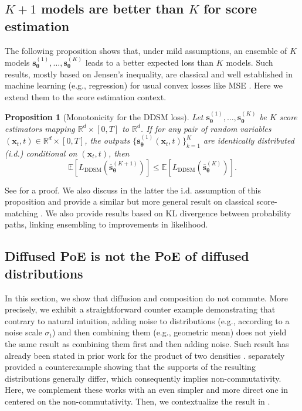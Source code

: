 \documentclass[10pt]{article} %
\newcommand{\DDSM}{\text{DDSM}}
\newtheorem{proposition}{Proposition}[section]
\def\rvx{{\mathbf{x}}}
\def\vtheta{{\bm{\theta}}}
\def\vs{{\bm{s}}}
\newcommand{\R}{\mathbb{R}}
\begin{document}
\subsection{$K+1$ models are better than $K$ for score estimation} \label{section: K models better for score}

The following proposition shows that, under mild assumptions, an ensemble of $K$ models $\vs_\vtheta^{(1)},\dots,\vs^{(K)}_\vtheta$ leads to a better expected loss than $K$ models. Such results, mostly based on Jensen's inequality, are classical and well established in machine learning (e.g., regression) for usual convex losses like MSE \citep{mcnees1992uses,breiman1996bagging,mattei2024ensemblesgettingbettertime}. Here we extend them to the score estimation context.

\begin{proposition}[Monotonicity for the DDSM loss]\label{proposition: ensemble monotonicity true score loss}
Let $\vs_\vtheta^{(1)}, \dots, \vs_\vtheta^{(K)}$ be $K$ score estimators mapping $\R^d \times [0,T]$ to $\R^d$. If for any pair of random variables $(\rvx_t, t) \in \R^d \times [0,T] $, the outputs $\{\vs^{(1)}_\vtheta(\rvx_t,t)\}_{k=1}^K $ are identically distributed (i.d.) conditional on $(\rvx_t,t)$, then
\begin{equation}
\mathbb{E}\left[ L_{\DDSM}(\overline{\vs}_\vtheta^{(K+1)}) \right] \leq \mathbb{E}\left[ L_{\DDSM}(\overline{\vs}_\vtheta^{(K)}) \right].
\end{equation}
\end{proposition}

See  for a proof. We also discuss in the latter the i.d. assumption of this proposition and provide a similar but more general result on classical score-matching \citep{hyvarinen2005estimation}. We also provide results based on KL divergence between probability paths, linking ensembling to improvements in likelihood.

\subsection{Diffused PoE is not the PoE of diffused distributions}\label{section: PoE pitfalls}

In this section, we show that diffusion and composition do not commute. More precisely, we exhibit a straightforward counter example demonstrating that contrary to natural intuition, adding noise to distributions (e.g., according to a noise scale $\sigma_t$) and then combining them (e.g., geometric mean) does not yield the same result as combining them first and then adding noise. Such result has already been stated in prior work for the product of two densities \citep{du2023reducereuserecyclecompositional}. \citet{chidambaram2024does} separately provided a counterexample showing that the supports of the resulting distributions generally differ, which consequently implies non-commutativity. Here, we complement these works with an even simpler and more direct one in  centered on the non-commutativity. Then, we contextualize the result in .
\end{document}
